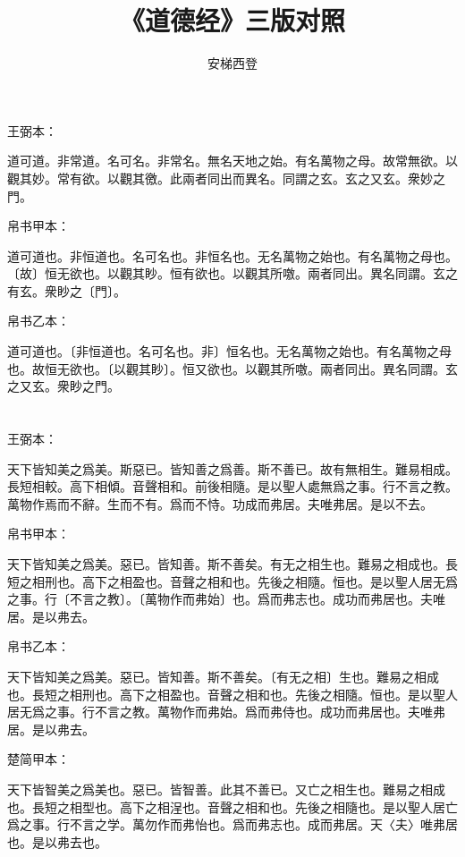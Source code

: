 \documentclass[a5paper]{ctexbook}
\title{《道德经》三版对照}
\author{安梯西登}
\date{}
\begin{document}
    \maketitle

    \tableofcontents

    \chapter{}
    王弼本：

    道可道。非常道。名可名。非常名。無名天地之始。有名萬物之母。故常無欲。以觀其妙。常有欲。以觀其徼。此兩者同出而異名。同謂之玄。玄之又玄。衆妙之門。

    
    帛书甲本：

    道可道也。非恒道也。名可名也。非恒名也。无名萬物之始也。有名萬物之母也。〔故〕恒无欲也。以觀其眇。恒有欲也。以觀其所噭。兩者同出。異名同謂。玄之有玄。衆眇之〔門〕。

    帛书乙本：

    道可道也。〔非恒道也。名可名也。非〕恒名也。无名萬物之始也。有名萬物之母也。故恒无欲也。〔以觀其眇〕。恒又欲也。以觀其所噭。兩者同出。異名同謂。玄之又玄。衆眇之門。

    \chapter{}
    王弼本：

    天下皆知美之爲美。斯惡已。皆知善之爲善。斯不善已。故有無相生。難易相成。長短相較。高下相傾。音聲相和。前後相隨。是以聖人處無爲之事。行不言之教。萬物作焉而不辭。生而不有。爲而不恃。功成而弗居。夫唯弗居。是以不去。

    
    帛书甲本：

    天下皆知美之爲美。惡已。皆知善。斯不善矣。有无之相生也。難易之相成也。長短之相刑也。高下之相盈也。音聲之相和也。先後之相隨。恒也。是以聖人居无爲之事。行〔不言之教〕。〔萬物作而弗始〕也。爲而弗志也。成功而弗居也。夫唯居。是以弗去。

    帛书乙本：

    天下皆知美之爲美。惡已。皆知善。斯不善矣。〔有无之相〕生也。難易之相成也。長短之相刑也。高下之相盈也。音聲之相和也。先後之相隨。恒也。是以聖人居无爲之事。行不言之教。萬物作而弗始。爲而弗侍也。成功而弗居也。夫唯弗居。是以弗去。

    楚简甲本：

    天下皆智美之爲美也。惡已。皆智善。此其不善已。又亡之相生也。難易之相成也。長短之相型也。高下之相浧也。音聲之相和也。先後之相隨也。是以聖人居亡爲之事。行不言之学。萬勿作而弗怡也。爲而弗志也。成而弗居。天〈夫〉唯弗居也。是以弗去也。
\end{document}
